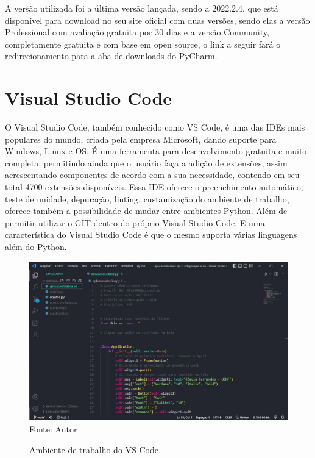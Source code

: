      A versão utilizada foi a última versão lançada, sendo a 2022.2.4, que está disponível para download no seu site oficial com duas versões, sendo elas a versão Professional com avaliação gratuita por 30 dias e a versão Community, completamente gratuita e com base em open source, o link a seguir fará o redirecionamento para a aba de downloads do \href{https://www.jetbrains.com/pt-br/pycharm/download/#section=windows}{PyCharm}.
    
    \section{Visual Studio Code}
	O Visual Studio Code, também conhecido como VS Code, é uma das IDEs mais populares do mundo, criada pela empresa Microsoft, dando suporte para Windows, Linux e OS. É uma ferramenta para desenvolvimento gratuita e muito completa, permitindo ainda que o usuário faça a adição de extensões, assim acrescentando componentes de acordo com a sua necessidade, contendo em seu total 4700 extensões disponíveis. Essa IDE oferece o preenchimento automático, teste de unidade, depuração, linting, custamização do ambiente de trabalho, oferece também a possibilidade de mudar entre ambientes Python. Além de permitir utilizar o GIT dentro do próprio Visual Studio Code. E uma característica do Visual Studio Code é que o mesmo suporta várias linguagens além do Python.
    
    \begin{figure}[H]
    	\begin{center}
    		\caption{Ambiente de trabalho do VS Code} \label{ling1}
    		\includegraphics[width=15cm]{vscode.JPG} \\
    		{\tiny \sf Fonte:{ Autor}}
    	\end{center}
    \end{figure}
    
